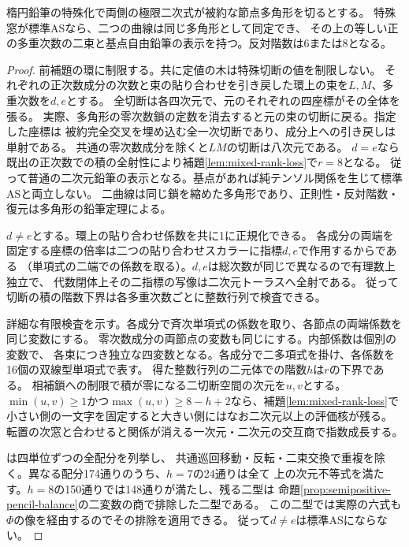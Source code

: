 \begin{theorem}[二つの環状モデルの次数一致]\label{thm:two-polygon-specialization}
楕円鉛筆の特殊化で両側の極限二次式が被約な節点多角形を切るとする。
特殊窓が標準ASなら、二つの曲線は同じ多角形として同定でき、
その上の等しい正の多重次数の二束と基点自由鉛筆の表示を持つ。反対階数は6または8となる。
\end{theorem}
\begin{proof}
前補題の環に制限する。共に定値の木は特殊切断の値を制限しない。
それぞれの正次数成分の次数と束の貼り合わせを引き戻した環上の束を$L,M$、多重次数を$d,e$とする。
全切断は各四次元で、元のそれぞれの四座標がその全体を張る。
実際、多角形の零次数鎖の定数を消去すると元の束の切断に戻る。指定した座標は
被約完全交叉を埋め込む全一次切断であり、成分上への引き戻しは単射である。
共通の零次数成分を除くと$LM$の切断は八次元である。
$d=e$なら既出の正次数での積の全射性により補題\ref{lem:mixed-rank-loss}で$r=8$となる。
従って普通の二次元鉛筆の表示となる。基点があれば純テンソル関係を生じて標準ASと両立しない。
二曲線は同じ鎖を縮めた多角形であり、正則性・反対階数・復元は多角形の鉛筆定理による。

$d\ne e$とする。環上の貼り合わせ係数を共に1に正規化できる。
各成分の両端を固定する座標の倍率は二つの貼り合わせスカラーに指標$d,e$で作用するからである
（単項式の二端での係数を取る）。$d,e$は総次数が同じで異なるので有理数上独立で、
代数閉体上その二指標の写像は二次元トーラスへ全射である。
従って切断の積の階数下界は各多重次数ごとに整数行列で検査できる。

詳細な有限検査を示す。各成分で斉次単項式の係数を取り、各節点の両端係数を同じ変数にする。
零次数成分の両節点の変数も同じにする。内部係数は個別の変数で、
各束につき独立な四変数となる。各成分で二多項式を掛け、各係数を16個の双線型単項式で表す。
得た整数行列の二元体での階数$h$は$r$の下界である。
相補鎖への制限で積が零になる二切断空間の次元を$u,v$とする。
$\min(u,v)\ge1$かつ$\max(u,v)\ge 8-h+2$なら、補題\ref{lem:mixed-rank-loss}で
小さい側の一文字を固定すると大きい側にはなお二次元以上の評価核が残る。
転置の次窓と合わせると関係が消える一次元・二次元の交互商で指数成長する。

は四単位ずつの全配分を列挙し、
共通巡回移動・反転・二束交換で重複を除く。異なる配分174通りのうち、$h=7$の24通りは全て
上の次元不等式を満たす。$h=8$の150通りでは148通りが満たし、残る二型は
命題\ref{prop:semipositive-pencil-balance}の二変数の商で排除した二型である。
この二型では実際の六式も$\Phi$の像を経由するのでその排除を適用できる。
従って$d\ne e$は標準ASにならない。
\end{proof}

